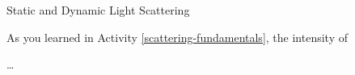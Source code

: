 \begin{activity}{Static and Dynamic Light Scattering}
\begin{instructornotes}
\end{instructornotes}



\begin{model}
	\label{\labelbase:mdl:SLS}
	
	
	
\end{model}


\begin{ctqs}

	\question 

	\question As you learned in Activity \ref{scattering-fundamentals}, the intensity of 
	
\end{ctqs}


\begin{model}
	\label{\labelbase:mdl:DLS}
	
	\dots
	
\end{model}

\begin{ctqs}

	\question 
	
\end{ctqs}






	


%
%	


	
\end{activity}